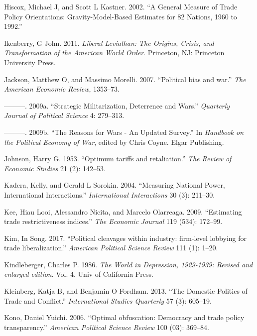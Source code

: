 \documentclass{puthesis}
\newlength{\cslhangindent}
\newenvironment{cslreferences}%
  {\setlength{\parindent}{0pt}%
  \everypar{\setlength{\hangindent}{\cslhangindent}}\ignorespaces}%
  {\par}
\begin{document}
\begin{cslreferences}
\leavevmode\hypertarget{ref-Hiscox2002}{}%
Hiscox, Michael J, and Scott L Kastner. 2002. ``A General Measure of
Trade Policy Orientations: Gravity-Model-Based Estimates for 82 Nations,
1960 to 1992.''

\leavevmode\hypertarget{ref-Ikenberry2011}{}%
Ikenberry, G John. 2011. \emph{Liberal Leviathan: The Origins, Crisis,
and Transformation of the American World Order}. Princeton, NJ:
Princeton University Press.

\leavevmode\hypertarget{ref-Jackson2007}{}%
Jackson, Matthew O, and Massimo Morelli. 2007. ``Political bias and
war.'' \emph{The American Economic Review}, 1353--73.

\leavevmode\hypertarget{ref-Jackson2009}{}%
---------. 2009a. ``Strategic Militarization, Deterrence and Wars.''
\emph{Quarterly Journal of Political Science} 4: 279--313.

\leavevmode\hypertarget{ref-Jackson2009b}{}%
---------. 2009b. ``The Reasons for Wars - An Updated Survey.'' In
\emph{Handbook on the Political Economy of War}, edited by Chris Coyne.
Elgar Publishing.

\leavevmode\hypertarget{ref-Johnson1953}{}%
Johnson, Harry G. 1953. ``Optimum tariffs and retaliation.'' \emph{The
Review of Economic Studies} 21 (2): 142--53.

\leavevmode\hypertarget{ref-Kadera2004}{}%
Kadera, Kelly, and Gerald L Sorokin. 2004. ``Measuring National Power,
International Interactions.'' \emph{International Interactions} 30 (3):
211--30.

\leavevmode\hypertarget{ref-Kee2009}{}%
Kee, Hiau Looi, Alessandro Nicita, and Marcelo Olarreaga. 2009.
``Estimating trade restrictiveness indices.'' \emph{The Economic
Journal} 119 (534): 172--99.

\leavevmode\hypertarget{ref-Kim2017}{}%
Kim, In Song. 2017. ``Political cleavages within industry: firm-level
lobbying for trade liberalization.'' \emph{American Political Science
Review} 111 (1): 1--20.

\leavevmode\hypertarget{ref-Kindleberger1986}{}%
Kindleberger, Charles P. 1986. \emph{The World in Depression, 1929-1939:
Revised and enlarged edition}. Vol. 4. Univ of California Press.

\leavevmode\hypertarget{ref-Kleinberg2013}{}%
Kleinberg, Katja B, and Benjamin O Fordham. 2013. ``The Domestic
Politics of Trade and Conflict.'' \emph{International Studies Quarterly}
57 (3): 605--19.

\leavevmode\hypertarget{ref-Kono2006}{}%
Kono, Daniel Yuichi. 2006. ``Optimal obfuscation: Democracy and trade
policy transparency.'' \emph{American Political Science Review} 100
(03): 369--84.


\end{cslreferences}
\end{document}
